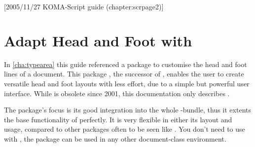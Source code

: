 %
%
%
%
%
%
%
%

[2005/11/27 KOMA-Script guide (chapter:scrpage2)]

\chapter{Adapt Head and Foot with }

%
%
%
In \autoref{cha:typearea} this guide referenced a package
to customise the head and foot lines of a document.
This package , the successor of ,
enables the user to create versatile head and foot layouts with
less effort, due to a simple but powerful user interface. While
 is obsolete since 2001, this documentation only describes
.

\begin{Explain}
  The package's focus is its good integration into the whole
  \KOMAScript{}-bundle, thus it extents the base functionality of
  \KOMAScript{} perfectly.  It is very flexible in either its layout and
  usage, compared to other packages often to be seen like
  \cite{package:fancyhdr}.  You don't need to use
   with \KOMAScript{}, the package can be used in any other
  document-class environment.
\end{Explain}


